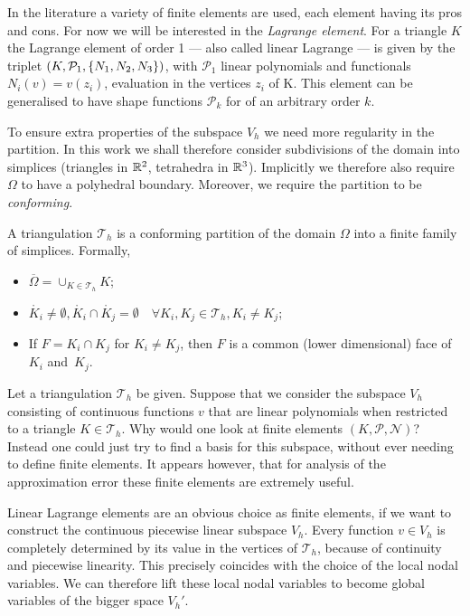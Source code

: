 \documentclass[thesis.tex]{subfiles}
\begin{document}
  In the literature a variety of finite elements are used, each element having its pros and cons. For now we will be interested in the \emph{Lagrange element}. For a triangle $K$ the Lagrange element of order 1 --- also called linear Lagrange --- is given by the triplet $(K, \mathcal{P}_1, \set{N_1, N_2, N_3})$, with $\mathcal{P}_1$ linear polynomials and functionals $N_i(v) = v(z_i)$, evaluation in the vertices $z_i$ of K. This element can be generalised to have shape functions $\mathcal{P}_k$ for of an arbitrary order $k$.

  To ensure extra properties of the subspace $V_h$ we need more regularity in the partition. In this work  we shall therefore consider subdivisions of the domain into simplices (triangles in $\mathbb{R}^2$, tetrahedra in $\mathbb{R}^3$). Implicitly we therefore also require $\Omega$ to have a polyhedral boundary. Moreover, we require the partition to be \emph{conforming}.
  \begin{defn}
    A triangulation $\mathcal{T}_h$ is a conforming partition of the domain $\Omega$ into a finite family of simplices.
    Formally,
    \begin{itemize}
      \item $\overline{\Omega} = \cup_{K \in \mathcal{T}_h} K$;
      \item $\mathring{K_i} \ne \emptyset, \mathring{K_i} \cap \mathring{K_j} = \emptyset \quad \forall K_i, K_j \in \mathcal{T}_h, K_i \ne K_j$;
    \item If $F = K_i \cap K_j$ for $K_i \ne K_j$, then $F$ is a common (lower dimensional) face of $K_i$ and~$K_j$.
  \end{itemize}
  \end{defn}
  
  Let a triangulation $\mathcal{T}_h$ be given. Suppose that we consider the subspace $V_h$ consisting
  of continuous functions $v$ that are linear polynomials when restricted to a triangle $K \in \mathcal{T}_h$. Why
  would one look at finite elements $(K, \mathcal{P}, \mathcal{N})$? 
  Instead one could just try to find a basis for this subspace, without ever needing to define finite elements.
  It appears however, that for analysis of the approximation error these finite elements are extremely useful.

  Linear Lagrange elements are an obvious choice as finite elements, if we want to construct the continuous piecewise linear subspace $V_h$.
  Every function $v \in V_h$ is completely
  determined by its value in the vertices of $\mathcal{T}_h$, because of continuity and piecewise linearity.
  This precisely coincides with the choice of the local nodal variables. We can therefore lift these local nodal variables to become
  global variables of the bigger space $V_h'$.
  
\end{document}
